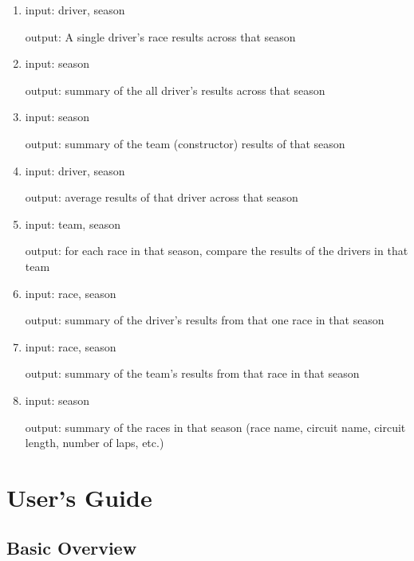 \documentclass{article} %
\begin{document}
\begin{enumerate}[label=(\arabic*)]
    \item %
    input: driver, season

    output: A single driver's race results across that season 

    \item %
    input: season

    output: summary of the all driver's results across that season

    \item %
    input: season

    output: summary of the team (constructor) results of that season

    \item %
    input: driver, season

    output: average results of that driver across that season

    \item %
    input: team, season 

    output: for each race in that season, compare the results of the
    drivers in that team

    \item %
    input: race, season 
    
    output: summary of the driver's results from that one race in that season

    \item %
    input: race, season 
    
    output: summary of the team's results from that race in that season

    \item %
    input: season

    output: summary of the races in that season (race name, circuit
    name, circuit length, number of laps, etc.)

\end{enumerate}


\section{User's Guide}

\subsection{Basic Overview}
\end{document}
